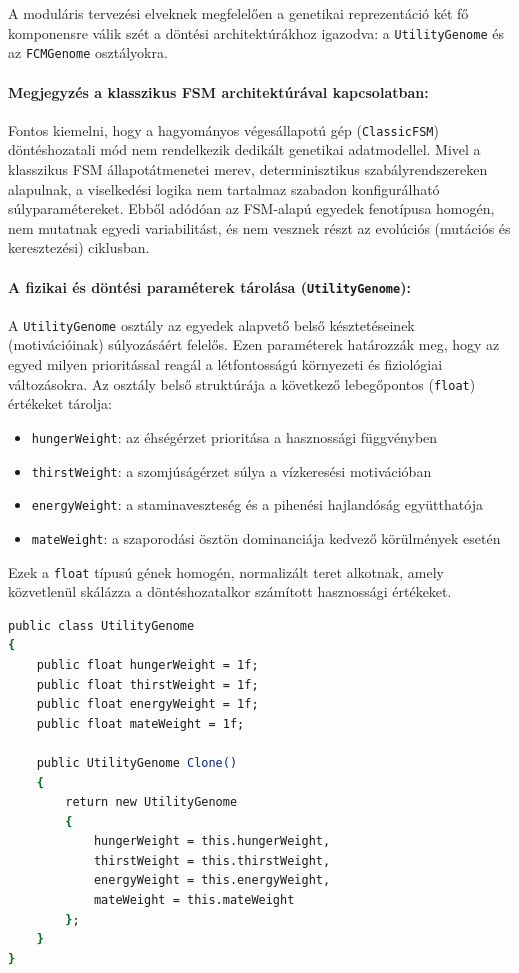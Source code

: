 A moduláris tervezési elveknek megfelelően a genetikai reprezentáció két fő komponensre válik szét a döntési architektúrákhoz igazodva: a \texttt{UtilityGenome} és az \texttt{FCMGenome} osztályokra.

\paragraph{Megjegyzés a klasszikus FSM architektúrával kapcsolatban:}
Fontos kiemelni, hogy a hagyományos végesállapotú gép (\texttt{ClassicFSM}) döntéshozatali mód nem rendelkezik dedikált genetikai adatmodellel. Mivel a klasszikus FSM állapotátmenetei merev, determinisztikus szabályrendszereken alapulnak, a viselkedési logika nem tartalmaz szabadon konfigurálható súlyparamétereket. Ebből adódóan az FSM-alapú egyedek fenotípusa homogén, nem mutatnak egyedi variabilitást, és nem vesznek részt az evolúciós (mutációs és keresztezési) ciklusban.

\paragraph{A fizikai és döntési paraméterek tárolása (\texttt{UtilityGenome}):}
A \texttt{UtilityGenome} osztály az egyedek alapvető belső késztetéseinek (motivációinak) súlyozásáért felelős. Ezen paraméterek határozzák meg, hogy az egyed milyen prioritással reagál a létfontosságú környezeti és fiziológiai változásokra. Az osztály belső struktúrája a következő lebegőpontos (\texttt{float}) értékeket tárolja:
\begin{itemize}
    \item \texttt{hungerWeight}: az éhségérzet prioritása a hasznossági függvényben
    \item \texttt{thirstWeight}: a szomjúságérzet súlya a vízkeresési motivációban
    \item \texttt{energyWeight}: a staminaveszteség és a pihenési hajlandóság együtthatója
    \item \texttt{mateWeight}: a szaporodási ösztön dominanciája kedvező körülmények esetén
\end{itemize}
Ezek a \texttt{float} típusú gének homogén, normalizált teret alkotnak, amely közvetlenül skálázza a döntéshozatalkor számított hasznossági értékeket.

\begin{lstlisting}[language=csh, caption={A UtilityGenome osztály belső felépítése}, label={lst:utility_genome}]
public class UtilityGenome
{
    public float hungerWeight = 1f;
    public float thirstWeight = 1f;
    public float energyWeight = 1f;
    public float mateWeight = 1f;

    public UtilityGenome Clone()
    {
        return new UtilityGenome
        {
            hungerWeight = this.hungerWeight,
            thirstWeight = this.thirstWeight,
            energyWeight = this.energyWeight,
            mateWeight = this.mateWeight
        };
    }
}
\end{lstlisting}

